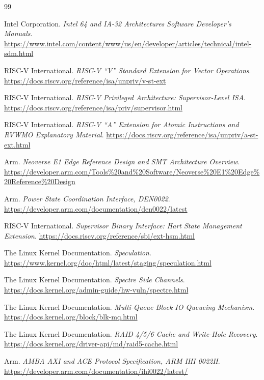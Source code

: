 \renewcommand{\bibname}{参考标准与延伸资料}
\begin{thebibliography}{99}

Intel Corporation.
\emph{Intel 64 and IA-32 Architectures Software Developer's Manuals}.
\url{https://www.intel.com/content/www/us/en/developer/articles/technical/intel-sdm.html}

RISC-V International.
\emph{RISC-V ``V'' Standard Extension for Vector Operations}.
\url{https://docs.riscv.org/reference/isa/unpriv/v-st-ext}

RISC-V International.
\emph{RISC-V Privileged Architecture: Supervisor-Level ISA}.
\url{https://docs.riscv.org/reference/isa/priv/supervisor.html}

RISC-V International.
\emph{RISC-V ``A'' Extension for Atomic Instructions and RVWMO Explanatory Material}.
\url{https://docs.riscv.org/reference/isa/unpriv/a-st-ext.html}

Arm.
\emph{Neoverse E1 Edge Reference Design and SMT Architecture Overview}.
\url{https://developer.arm.com/Tools%20and%20Software/Neoverse%20E1%20Edge%20Reference%20Design}

Arm.
\emph{Power State Coordination Interface, DEN0022}.
\url{https://developer.arm.com/documentation/den0022/latest}

RISC-V International.
\emph{Supervisor Binary Interface: Hart State Management Extension}.
\url{https://docs.riscv.org/reference/sbi/ext-hsm.html}

The Linux Kernel Documentation.
\emph{Speculation}.
\url{https://www.kernel.org/doc/html/latest/staging/speculation.html}

The Linux Kernel Documentation.
\emph{Spectre Side Channels}.
\url{https://docs.kernel.org/admin-guide/hw-vuln/spectre.html}

The Linux Kernel Documentation.
\emph{Multi-Queue Block IO Queueing Mechanism}.
\url{https://docs.kernel.org/block/blk-mq.html}

The Linux Kernel Documentation.
\emph{RAID 4/5/6 Cache and Write-Hole Recovery}.
\url{https://docs.kernel.org/driver-api/md/raid5-cache.html}

Arm.
\emph{AMBA AXI and ACE Protocol Specification, ARM IHI 0022H}.
\url{https://developer.arm.com/documentation/ihi0022/latest/}


\end{thebibliography}
